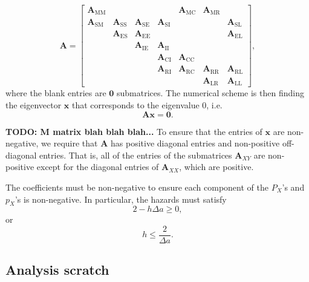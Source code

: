 \documentclass[12pt]{article}
\renewcommand{\vec}[1]{\mathbf{#1}}
\newcommand{\mat}[1]{\mathbf{#1}}
\begin{document}
\begin{equation}
  \mat{A} =
  \begin{bmatrix}
    \mat{A}_{\mathrm{MM}} & & & &
    \mat{A}_{\mathrm{MC}} &
    \mat{A}_{\mathrm{MR}} &
    \\
    \mat{A}_{\mathrm{SM}} &
    \mat{A}_{\mathrm{SS}} &
    \mat{A}_{\mathrm{SE}} &
    \mat{A}_{\mathrm{SI}} & & &
    \mat{A}_{\mathrm{SL}}
    \\
    &
    \mat{A}_{\mathrm{ES}} &
    \mat{A}_{\mathrm{EE}} & & & &
    \mat{A}_{\mathrm{EL}}
    \\
    & &
    \mat{A}_{\mathrm{IE}} &
    \mat{A}_{\mathrm{II}} & & &
    \\
    & & &
    \mat{A}_{\mathrm{CI}} &
    \mat{A}_{\mathrm{CC}} & &
    \\
    & & &
    \mat{A}_{\mathrm{RI}} &
    \mat{A}_{\mathrm{RC}} &
    \mat{A}_{\mathrm{RR}} &
    \mat{A}_{\mathrm{RL}}
    \\
    & & & & &
    \mat{A}_{\mathrm{LR}} &
    \mat{A}_{\mathrm{LL}}
  \end{bmatrix},
\end{equation}
where the blank entries are $\mat{0}$
submatrices.  The numerical scheme is then finding the eigenvector
$\vec{x}$ that corresponds to the eigenvalue $0$, i.e.
\begin{equation}
  \mat{A} \vec{x} = \vec{0}.
\end{equation}

\textbf{TODO: M matrix blah blah blah...}
To ensure that the entries of $\vec{x}$ are non-negative,
we require that $\mat{A}$ has positive diagonal entries and
non-positive off-diagonal entries.
That is, all of the entries of the submatrices $\mat{A}_{XY}$
are non-positive except for the diagonal entries of $\mat{A}_{XX}$,
which are positive.



The coefficients must be non-negative to ensure each component of the
$P_X$'s and $p_X$'s is non-negative. In particular, the hazards must
satisfy
\begin{equation}
  2 - h \Delta a \geq 0,
\end{equation}
or
\begin{equation}
  h \leq \frac{2}{\Delta a}.
\end{equation}


\subsection{Analysis scratch}
\end{document}
